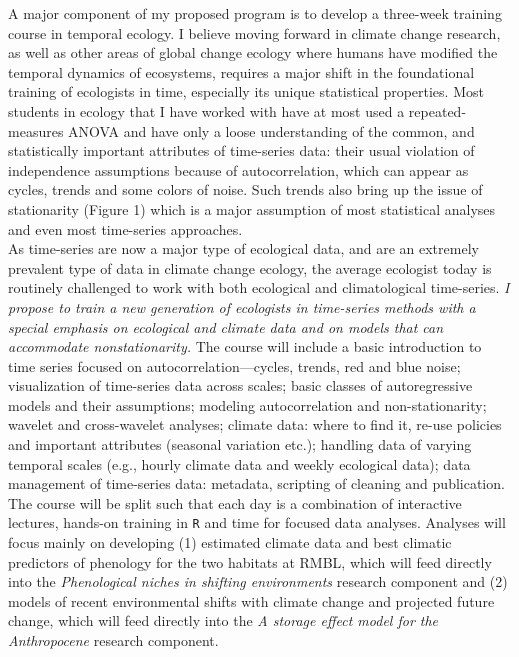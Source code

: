 \documentclass[12pt,a4paper,oneside]{article}
\begin{document}
A major component of my proposed program is to develop a three-week training course in temporal ecology. I believe moving forward in climate change research, as well as other areas of global change ecology where humans have modified the temporal dynamics of ecosystems, requires a major shift in the foundational training of ecologists in time, especially its unique statistical properties. Most students in ecology that I have worked with have at most used a repeated-measures ANOVA and have only a loose understanding of the common, and statistically important attributes of time-series data: their usual violation of independence assumptions because of autocorrelation, which can appear as cycles, trends and some colors of noise. Such trends also bring up the issue of stationarity (Figure 1) which is a major assumption of most statistical analyses and even most time-series approaches. 
\vspace{1.5ex}\\
As time-series are now a major type of ecological data, and are an extremely prevalent type of data in climate change ecology, the average ecologist today is routinely challenged to work with both ecological and climatological time-series. \emph{I propose to train a new generation of ecologists in time-series methods with a special emphasis on ecological and climate data and on models that can accommodate nonstationarity.} The course will include a basic introduction to time series focused on autocorrelation---cycles, trends, red and blue noise; visualization of time-series data across scales; basic classes of autoregressive models and their assumptions; modeling autocorrelation and non-stationarity; wavelet and cross-wavelet analyses; climate data: where to find it, re-use policies and important attributes (seasonal variation etc.); handling data of varying temporal scales (e.g., hourly climate data and weekly ecological data); data management of time-series data: metadata, scripting of cleaning and publication. The course will be split such that each day is a combination of interactive lectures, hands-on training in \verb|R| and time for focused data analyses. Analyses will focus mainly on developing (1) estimated climate data and best climatic predictors of phenology for the two habitats at RMBL, which will feed directly into the \emph{Phenological niches in shifting environments} research component and (2) models of recent environmental shifts with climate change and projected future change, which will feed directly into the \emph{A storage effect model for the Anthropocene} research component. 
\end{document}
